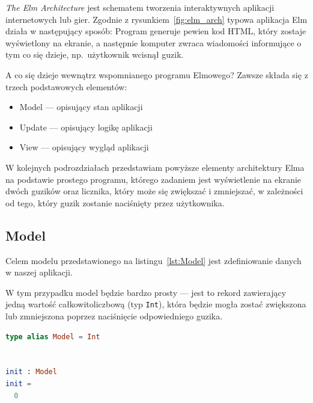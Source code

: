 \documentclass[twoside,a4paper]{report}
\begin{document}
\textit{The Elm Architecture} jest schematem tworzenia interaktywnych aplikacji internetowych lub gier.
Zgodnie z rysunkiem~\ref{fig:elm_arch} typowa aplikacja Elm działa w następujący sposób:
Program generuje pewien kod HTML, który zostaje wyświetlony na ekranie, a następnie komputer zwraca wiadomości informujące o tym co się dzieje, np.~użytkownik wcisnął guzik.

A co się dzieje wewnątrz wspomnianego programu Elmowego? Zawsze składa się z trzech podstawowych elementów:
\begin{itemize}[noitemsep,topsep=0pt]
    \item Model --- opisujący stan aplikacji
    \item Update --- opisujący logikę aplikacji
    \item View --- opisujący wygląd aplikacji
\end{itemize}

W kolejnych podrozdziałach przedstawiam powyższe elementy architektury Elma na podstawie prostego programu, którego zadaniem jest wyświetlenie na ekranie dwóch guzików oraz licznika, który może się zwiększać i zmniejszać, w zależności od tego, który guzik zostanie naciśnięty przez użytkownika.

\subsection{Model}
\begin{minipage}{.50\textwidth}
    Celem modelu przedstawionego na listingu~\ref{lst:Model} jest zdefiniowanie danych w naszej aplikacji.

    W tym przypadku model będzie bardzo prosty --- jest to rekord zawierający jedną wartość całkowitoliczbową (typ \texttt{Int}), która będzie mogła zostać zwiększona lub zmniejszona poprzez naciśnięcie odpowiedniego guzika.
\end{minipage}\hfill
\begin{minipage}{.43\textwidth}
\begin{lstlisting}[caption={\textit{The Elm Architecture} --- Model},label={lst:Model},language={Elm}]
type alias Model = Int


init : Model
init =
  0
    \end{lstlisting}
\end{minipage}\hfill
\end{document}
